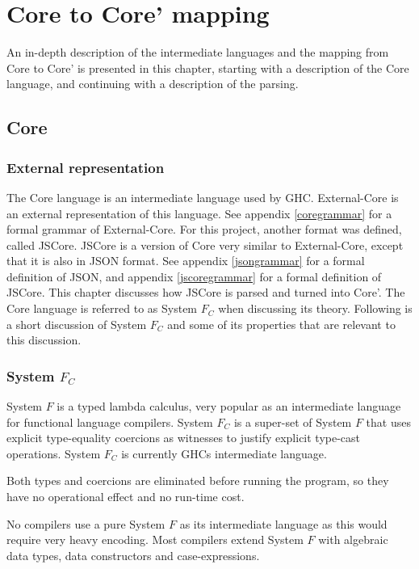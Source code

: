 
\chapter{Core to Core' mapping}
\label{chap:rewrite}

An in-depth description of the intermediate languages and the mapping from
Core to Core' is presented in this chapter, 
starting with a description of the Core language, and continuing with a 
description of the parsing. 

\section{Core}

\subsection*{External representation}

The Core language is an intermediate language used by GHC. External-Core
is an external representation of this language. See appendix 
\ref{coregrammar} for a formal grammar of External-Core. For this project,
another format was defined, called JSCore. JSCore is a version of Core
very similar to External-Core, except that it is also in JSON format. 
See appendix \ref{jsongrammar} for a formal definition of JSON, and 
appendix \ref{jscoregrammar} for a formal definition of JSCore. This
chapter discusses how JSCore is parsed and turned into Core'. The Core
language is referred to as System $F_C$ when discussing its theory.
Following is a short discussion of System $F_C$ and some of its 
properties that are relevant to this discussion.

\subsection*{System $F_C$}

System $F$ is a typed lambda calculus, very popular as an intermediate language
for functional language compilers. System $F_C$ is a super-set of System $F$ 
that uses explicit type-equality coercions as witnesses to justify explicit
type-cast operations. System $F_C$ is currently GHCs intermediate language.
\cite{sulzmann2007system}

Both types and coercions are eliminated before running the program, so they have
no operational effect and no run-time cost.
\cite{sulzmann2007system}

No compilers use a pure System $F$ as its intermediate language as this would
require very heavy encoding. Most compilers extend System $F$ with algebraic
data types, data constructors and case-expressions.
\cite{sulzmann2007system}

